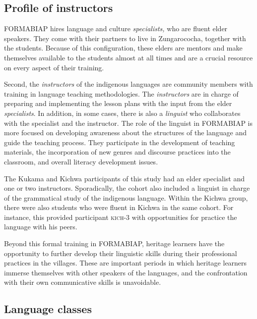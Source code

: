 \documentclass[output=paper]{langscibook}
\begin{document}
\subsection{Profile of instructors}\label{sec:7:3.3}

FORMABIAP hires language and culture \textit{specialists,} who are fluent elder speakers. They come with their partners to live in Zungarococha, together with the students. Because of this configuration, these elders are mentors and make themselves available to the students almost at all times and are a crucial resource on every aspect of their training.

Second, the \textit{instructors} of the indigenous languages are community members with training in language teaching methodologies. The \textit{instructors} are in charge of preparing and implementing the lesson plans with the input from the elder \textit{specialists}. In addition, in some cases, there is also a \textit{linguist} who collaborates with the specialist and the instructor. The role of the linguist in FORMABIAP is more focused on developing awareness about the structures of the language and guide the teaching process. They participate in the development of teaching materials, the incorporation of new genres and discourse practices into the classroom, and overall literacy development issues.

The Kukama and Kichwa participants of this study had an elder specialist and one or two instructors. Sporadically, the cohort also included a linguist in charge of the grammatical study of the indigenous language. Within the Kichwa group, there were also students who were fluent in Kichwa in the same cohort. For instance, this provided participant \textsc{kich}{}-3 with opportunities for practice the language with his peers.

Beyond this formal training in FORMABIAP, heritage learners have the opportunity to further develop their linguistic skills during their professional practices in the villages. These are important periods in which heritage learners immerse themselves with other speakers of the languages, and the confrontation with their own communicative skills is unavoidable.

\subsection{Language classes}
\end{document}
